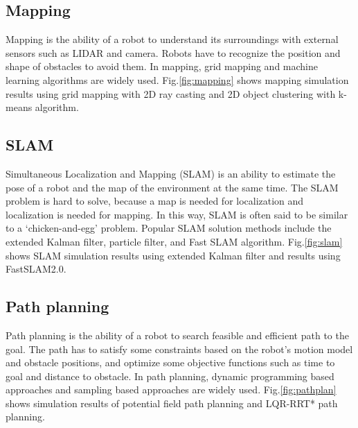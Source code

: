 \documentclass{bmvc2k}
\begin{document}
\subsection{Mapping}
Mapping is the ability of a robot to understand its surroundings with external sensors such as LIDAR and camera.
Robots have to recognize the position and shape of obstacles to avoid them.
In mapping, grid mapping and machine learning algorithms are widely used\cite{PR}\cite{PRML}.
Fig.\ref{fig:mapping} shows mapping simulation results using grid mapping with 2D ray casting and 2D object clustering with k-means algorithm.

\subsection{SLAM}
Simultaneous Localization and Mapping (SLAM) is an ability to estimate the pose of a robot and the map of the environment at the same time.
The SLAM problem is hard to solve, because a map is needed for localization and localization is needed for mapping.
In this way, SLAM is often said to be similar to a `chicken-and-egg' problem.
Popular SLAM solution methods include the extended Kalman filter, particle filter, and Fast SLAM algorithm\cite{PR}.
Fig.\ref{fig:slam} shows SLAM simulation results using extended Kalman filter and results using FastSLAM2.0\cite{PR}.

\subsection{Path planning}

Path planning is the ability of a robot to search feasible and efficient path to the goal.
The path has to satisfy some constraints based on the robot's motion model and obstacle positions, and optimize some objective functions such as time to goal and distance to obstacle.
In path planning, dynamic programming based approaches and sampling based approaches are widely used\cite{pathplanning}.
Fig.\ref{fig:pathplan} shows simulation results of potential field path planning and LQR-RRT* path planning\cite{lqrrrt}.
\end{document}
